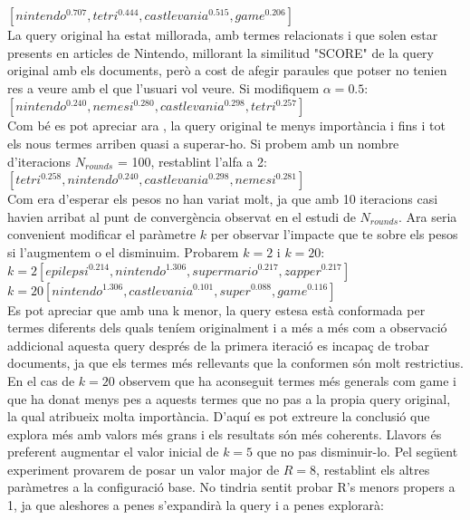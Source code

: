 \documentclass[12pt]{article}
\begin{document}
$[nintendo^{0.707}, tetri^{0.444}, castlevania^{0.515}, game^{0.206}]$
 \\ 
 
La query original ha estat millorada, amb termes relacionats i que solen estar presents en articles de Nintendo, millorant la similitud "SCORE" de la query original amb els documents, però a cost de afegir paraules que potser no tenien res a veure amb el que l'usuari vol veure. Si modifiquem $\alpha = 0.5$:
\\ 

$[nintendo^{0.240}, nemesi^{0.280}, castlevania^{0.298}, tetri^{0.257}]$
\\

Com bé es pot apreciar ara , la query original te menys importància i fins i tot els nous termes arriben quasi a superar-ho. Si probem amb un nombre d'iteracions  $N_{rounds}$ = 100, restablint l'alfa a 2:
\\ 

$[tetri^{0.258}, nintendo^{0.240}, castlevania^{0.298}, nemesi^{0.281}]$
\\ 

Com era d'esperar els pesos no han variat molt, ja que amb 10 iteracions casi havien arribat al punt de convergència observat en el estudi de $N_{rounds}$. Ara seria convenient modificar el paràmetre $k$ per observar l'impacte que te sobre els pesos si l'augmentem o el disminuim. Probarem $k = 2$ i $k = 20$:
\\ 

$ k = 2 [epilepsi^{0.214}, nintendo^{1.306}, supermario^{0.217}, zapper^{0.217}]$
\\

$ k = 20 [nintendo^{1.306}, castlevania^{0.101}, super^{0.088}, game^{0.116}]$
\\ 

Es pot apreciar que amb una k menor, la query estesa està conformada per termes diferents dels quals teníem originalment i a més a més com a observació addicional aquesta query després de la primera iteració es incapaç de trobar documents, ja que els termes més rellevants que la conformen són molt restrictius. En el cas de $k = 20$ observem que ha aconseguit termes més generals com game i que ha donat menys pes a aquests termes que no pas a la propia query original, la qual atribueix molta importància. D'aquí es pot extreure la conclusió que explora més amb valors més grans i els resultats són més coherents. Llavors és preferent augmentar el valor inicial de $k = 5$ que no pas disminuir-lo.
Pel següent experiment provarem de posar un valor major de $R = 8$, restablint els altres paràmetres a la configuració base. No tindria sentit probar R's menors propers a 1, ja que aleshores a penes s'expandirà la query i a penes explorarà:
\\ 
\end{document}
